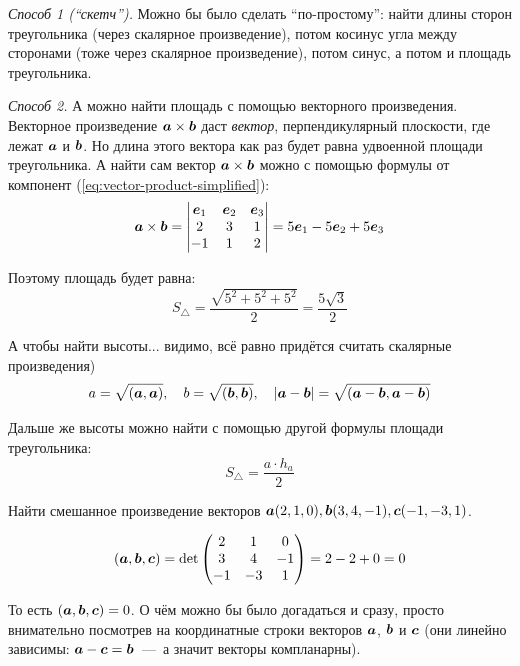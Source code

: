 \documentclass[a4paper,12pt]{article}
\begin{document}
  \begin{solution}
    \leavevmode
    
    \emph{Способ 1 (``скетч'').}
    Можно бы было сделать ``по-простому'': найти длины сторон треугольника (через скалярное произведение), потом косинус угла между сторонами (тоже через скалярное произведение), потом синус, а потом и площадь треугольника.
    
    \medskip
    \emph{Способ 2.}
    А можно найти площадь с помощью векторного произведения.
    Векторное произведение $\bds a \hm\times \bds b$ даст \emph{вектор}, перпендикулярный плоскости, где лежат $\boldsymbol a$ и $\boldsymbol b$.
    Но длина этого вектора как раз будет равна удвоенной площади треугольника.
    А найти сам вектор $\bds a \hm\times \bds b$ можно с помощью формулы от компонент (\ref{eq:vector-product-simplified}):
    \[
      \boldsymbol a \times \boldsymbol b = \begin{vmatrix}
        \boldsymbol e_1 & \boldsymbol e_2 & \boldsymbol e_3\\
        2 & 3 & 1\\
        -1 & 1 & 2
      \end{vmatrix}
      = 5 \boldsymbol e_1 - 5 \boldsymbol e_2 + 5 \boldsymbol e_3
    \]
    
    Поэтому площадь будет равна:
    \[
      S_{\triangle} = \frac{\sqrt{5^2 + 5^2 + 5^2}}{2} = \frac{5 \sqrt{3}}{2}
    \]
    
    А чтобы найти высоты... видимо, всё равно придётся считать скалярные произведения)
    \[
      a = \sqrt{(\boldsymbol a, \boldsymbol a)}, \quad b = \sqrt{(\boldsymbol b, \boldsymbol b)}, \quad |\boldsymbol a - \boldsymbol b| = \sqrt{(\boldsymbol a - \boldsymbol b, \boldsymbol a - \boldsymbol b)}
    \]
    
    Дальше же высоты можно найти с помощью другой формулы площади треугольника:
    \[
      S_{\triangle} = \frac{a \cdot h_a}{2}
    \]
  \end{solution}
  
  
  \begin{problem}[3.19(3)]
    Найти смешанное произведение векторов $\boldsymbol a(2, 1, 0), \boldsymbol b(3, 4, -1), \boldsymbol c(-1, -3, 1)$.
  \end{problem}

  \begin{solution}
    \[
      (\boldsymbol a, \boldsymbol b, \boldsymbol c) = \det\begin{pmatrix}
        2 & 1 & 0\\
        3 & 4 & -1\\
        -1 & -3 & 1
      \end{pmatrix}
      = 2 - 2 + 0 = 0
    \]
    
    То есть $(\bds a, \bds b, \bds c) \hm= 0$.
    О чём можно бы было догадаться и сразу, просто внимательно посмотрев на координатные строки векторов $\boldsymbol a$, $\boldsymbol b$ и $\boldsymbol c$ (они линейно зависимы: $\bds a \hm- \bds c \hm= \bds b$~---~а значит векторы компланарны).
  \end{solution}
  
\end{document}
